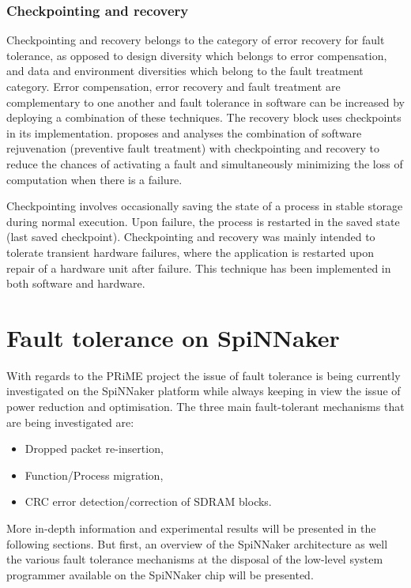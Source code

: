 \documentclass[oneside, a4paper, 11pt]{memoir}
\begin{document}
\subsection{Checkpointing and recovery}
Checkpointing and recovery \citep{kulkarni1990effects} belongs to the category of error recovery for fault tolerance, as opposed to design diversity which belongs to error compensation, and data and environment diversities which belong to the fault treatment category. Error compensation, error recovery and fault treatment are complementary to one another and fault tolerance in software can be increased by deploying a combination of these techniques. The recovery block uses checkpoints in its implementation. \citet{garg1996minimizing} proposes and analyses the combination of software rejuvenation (preventive fault treatment) with checkpointing and recovery to reduce the chances of activating a fault and simultaneously minimizing the loss of computation when there is a failure.

Checkpointing involves occasionally saving the state of a process in stable storage during normal execution. Upon failure, the process is restarted in the saved state (last saved checkpoint). Checkpointing and recovery was mainly intended to tolerate transient hardware failures, where the application is restarted upon repair of a hardware unit after failure. This technique has been implemented in both software and hardware.

\chapter{Fault tolerance on SpiNNaker}
\label{sec:ft_spinnaker}

With regards to the PRiME project the issue of fault tolerance is being currently investigated on the SpiNNaker platform while always keeping in view the issue of power reduction and optimisation. The three main fault-tolerant mechanisms that are being investigated are:
\begin{itemize}
\item Dropped packet re-insertion,
\item Function/Process migration,
\item CRC error detection/correction of SDRAM blocks.
\end{itemize}
More in-depth information and experimental results will be presented in the following sections. But first, an overview of the SpiNNaker architecture as well the various fault tolerance mechanisms at the disposal of the low-level system programmer available on the SpiNNaker chip will be presented.
\end{document}
